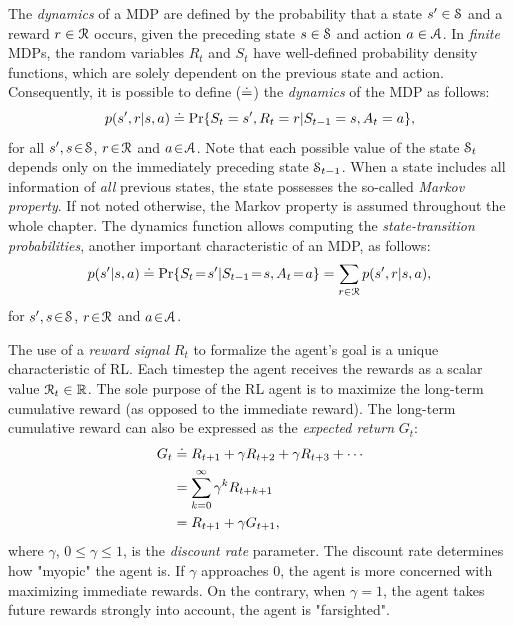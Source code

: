 \documentclass[a4paper, 12pt]{article}
\begin{document}
The \emph{dynamics} of a MDP are defined by the probability that a state \(s'\in \S\)
and a reward \(r\in\R\) occurs, given the preceding state \(s\in\S\) and action
\(a\in\A\). In \emph{finite} MDPs, the random variables \(R_t\) and \(S_t\) have
well-defined probability density functions, which are solely dependent on the
previous state and action. Consequently, it is possible to define (\(\defeq\)) the
\emph{dynamics} of the MDP as follows:
\begin{equation}
    p(s',r|s,a) \defeq \Pr{S_t=s',R_t=r|S_{t-1}=s,A_t=a},
\end{equation}
for all \(s',s\!\in\!\S\), \(r\!\in\!\R\) and \(a\!\in\!\A\). Note that each possible
value of the state \(\S_t\) depends only on the immediately preceding state
\(\S_{t-1}\). When a state includes all information of \emph{all} previous states, the
state possesses the so-called \emph{Markov property}. If not noted otherwise, the
Markov property is assumed throughout the whole chapter. The dynamics function
allows computing the \emph{state-transition probabilities}, another important
characteristic of an MDP, as follows:
\begin{equation}
    p(s'|s,a) \defeq \Pr{S_t\!=\!s'|S_{t-1}\!=\!s,A_t\!=\!a} = \sum_{r\in\R}{p(s', r|s, a)},
\end{equation}
for \(s',s\!\in\!\S\), \(r\!\in\!\R\) and \(a\!\in\!\A\).

The use of a \emph{reward signal} \(R_t\) to formalize the agent's goal is a unique
characteristic of RL. Each timestep the agent receives the rewards as a scalar
value \(\R_t\in\Re\). The sole purpose of the RL agent is to maximize the
long-term cumulative reward (as opposed to the immediate reward). The long-term
cumulative reward can also be expressed as the \emph{expected return} \(G_t\):
\begin{equation} \label{eq-expected-return}
\begin{split}
    G_t &\defeq R_{t+1} + \gamma R_{t+2} + \gamma R_{t+3} + \cdots \\
    &= \sum_{k=0}^{\infty}{\gamma^k R_{t+k+1}} \\
    &= R_{t+1} + \gamma G_{t+1},
\end{split}
\end{equation}
where \(\gamma\), \(0\leq\gamma\leq 1\), is the \emph{discount rate} parameter. The
discount rate determines how "myopic" the agent is. If \(\gamma\) approaches 0,
the agent is more concerned with maximizing immediate rewards. On the contrary,
when \(\gamma\!=\! 1\), the agent takes future rewards strongly into account, the
agent is "farsighted".
\end{document}
